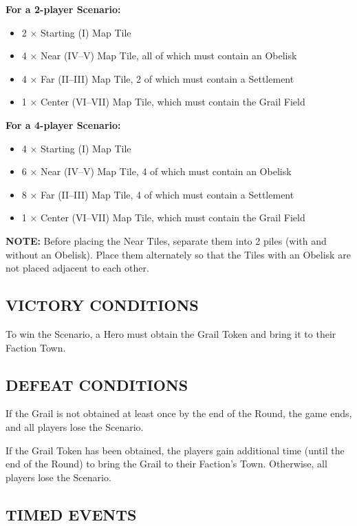 \begin{multicols*}{2}
\textbf{For a 2-player Scenario:}
\begin{itemize}
  \item 2 × Starting (I) Map Tile
  \item 4 × Near (IV--V) Map Tile, all of which must contain an Obelisk
  \item 4 × Far (II--III) Map Tile, 2 of which must contain a Settlement
  \item 1 × Center (VI--VII) Map Tile, which must contain the Grail Field
\end{itemize}

\textbf{For a 4-player Scenario:}
\begin{itemize}
  \item 4 × Starting (I) Map Tile
  \item 6 × Near (IV--V) Map Tile, 4 of which must contain an Obelisk
  \item 8 × Far (II--III) Map Tile, 4 of which must contain a Settlement
  \item 1 × Center (VI--VII) Map Tile, which must contain the Grail Field
\end{itemize}

\textbf{\MakeUppercase{Note:}} Before placing the Near Tiles, separate them into 2 piles (with and without an Obelisk). Place them alternately so that the Tiles with an Obelisk are not placed adjacent to each other.

\subsection*{\MakeUppercase{Victory Conditions}}
To win the Scenario, a Hero must obtain the Grail Token and bring it to their Faction Town.

\subsection*{\MakeUppercase{Defeat Conditions}}
If the Grail is not obtained at least once by the end of the  Round, the game ends, and all players lose the Scenario.

If the Grail Token has been obtained, the players gain additional time (until the end of the  Round) to bring the Grail to their Faction's Town. Otherwise, all players lose the Scenario.

\subsection*{\MakeUppercase{Timed Events}}


\end{multicols*}
